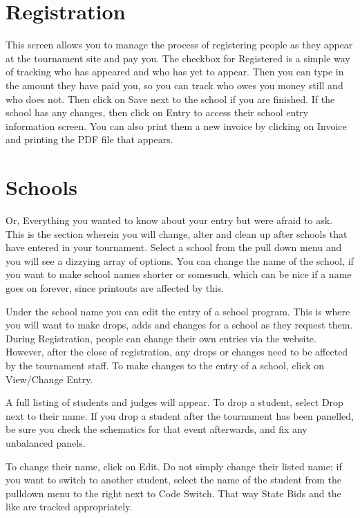 \documentclass[12pt]{report} \usepackage {fullpage} \usepackage{times}
\begin{document}
\section{Registration}

This screen allows you to manage the process of registering people as they
appear at the tournament site and pay you.   The checkbox for Registered is
a simple way of tracking who has appeared and who has yet to appear.   Then
you can type in the amount they have paid you, so you can track who owes
you money still and who does not.   Then click on Save next to the school
if you are finished.   If the school has any changes, then click on Entry
to access their school entry information screen.   You can also print them
a new invoice by clicking on Invoice and printing the PDF file that
appears.  
 	
\section{Schools}

Or, Everything you wanted to know about your entry but were afraid to ask.
This is the section wherein you will change, alter and clean up after
schools that have entered in your tournament.   Select a school from the
pull down menu and you will see a dizzying array of options.   You can
change the name of the school, if you want to make school names shorter or
somesuch, which can be nice if a name goes on forever, since printouts are
affected by this.   

Under the school name you can edit the entry of a school program.  This is
where you will want to make drops, adds and changes for a school as they
request them.  	During Registration, people can change their own entries
via the website.  However, after the close of registration, any drops or
changes need to be affected by the tournament staff.     To make changes to
the entry of a school, click on View/Change Entry.

A full listing of students and judges will appear.  To drop a student,
select Drop next to their name.   If you drop a student after the
tournament has been panelled, be sure you check the schematics for that
event afterwards, and fix any unbalanced panels. 

To change their name, click on Edit.   Do not simply change their listed
name; if you want to switch to another student, select the name of the
student from the pulldown menu to the right next to Code Switch.  That way
State Bids and the like are tracked appropriately.   
\end{document}
